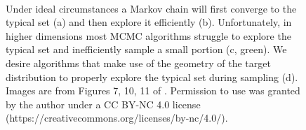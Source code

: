 \begin{figure}
	 \\
	\caption{Under ideal circumstances a Markov chain will first converge to the typical set (a) and then explore it efficiently (b). Unfortunately, in higher dimensions most MCMC algorithms struggle to explore the typical set and inefficiently sample a small portion (c, green). We desire algorithms that make use of the geometry of the target distribution to properly explore the typical set during sampling (d). Images are from Figures 7, 10, 11 of \cite{Betancourt2017}. Permission to use was granted by the author under a CC BY-NC 4.0 license (https://creativecommons.org/licenses/by-nc/4.0/).}
	\label{fig:mcmc}
\end{figure}

